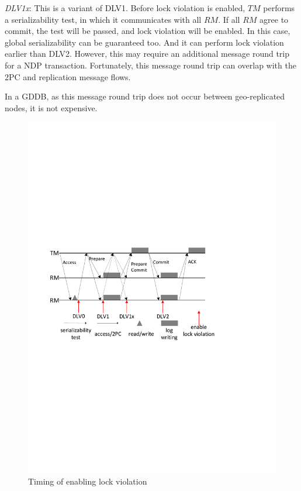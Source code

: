 \documentclass[conference]{IEEEtran}
\begin{document}
\emph{DLV1x}:
This is a variant of DLV1.
Before lock violation is enabled, ${TM}$ performs a serializability test, in which it communicates with all ${RM}$.
If all ${RM}$ agree to commit, the test will be passed, and lock violation will be enabled.
In this case, global serializability can be guaranteed too. And it can perform lock violation earlier than DLV2.
However, this may require an additional message round trip for a NDP transaction.
Fortunately, this message round trip can overlap with the 2PC and replication message flows.

In a GDDB, as this message round trip does not occur between geo-replicated nodes, it is not expensive.

\begin{figure}[tbp]
  \centerline{\includegraphics[scale=0.50]{figure/lock_violation_time.pdf}}
  \caption
  {Timing of enabling lock violation}
\label{fig:lock_violation_time}
\end{figure}
\end{document}

